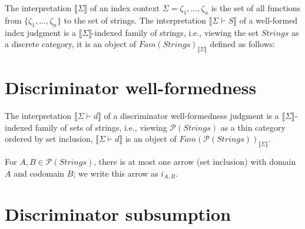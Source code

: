 \documentclass{article}
\newcommand{\sem}[1]{\llbracket #1 \rrbracket}
\begin{document}
The interpretation $\sem{\Sigma}$ of an index context $\Sigma = \zeta_1, \ldots, \zeta_n$ is the set of all functions from $\{ \zeta_1, \ldots, \zeta_n \}$ to the set of strings. The interpretation $\sem{\Sigma \vdash S}$ of a well-formed index judgment is a $\sem{\Sigma}$-indexed family of strings, i.e., viewing the set $\mathit{Strings}$ as a discrete category, it is an object of $\mathit{Fam}(\mathit{Strings})_{\sem{\Sigma}}$ defined as follows:

\section*{Discriminator well-formedness}


The interpretation $\sem{\Sigma \vdash d}$ of a discriminator well-formedness judgment is a $\sem{\Sigma}$-indexed family of sets of strings, i.e., viewing $\mathcal P(\mathit{Strings})$ as a thin category ordered by set inclusion, $\sem{\Sigma \vdash d}$ is an object of $\mathit{Fam}(\mathcal P(\mathit{Strings}))_{\sem{\Sigma}}$. 

For $A,B \in \mathcal P(\mathit{Strings})$, there is at most one arrow (set inclusion) with domain $A$ and 
codomain $B$; we write this arrow as $i_{A,B}$.


\section*{Discriminator subsumption}
\end{document}
